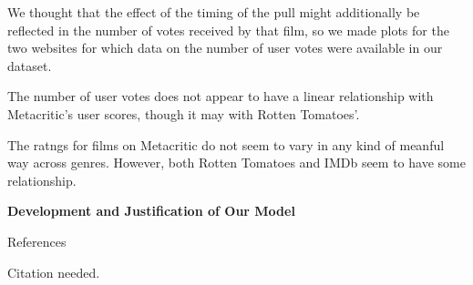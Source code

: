 \documentclass[a4paper,12pt]{report}
\begin{document}
	We thought that the effect of the timing of the pull might additionally be reflected in the number of votes received by that film, so we made plots for the two websites for which data on the number of user votes were available in our dataset.
	\begin{center}
	\end{center}
	The number of user votes does not appear to have a linear relationship with Metacritic's user scores, though it may with Rotten Tomatoes'.
	\begin{center}
	\end{center}
	The ratngs for films on Metacritic do not seem to vary in any kind of meanful way across genres. However, both Rotten Tomatoes and IMDb seem to have some relationship.
	\begin{center}
	\end{center}
	\begin{center}
		\textbf{Development and Justification of Our Model}
	\end{center}
	\justify
	\lipsum[14-17]
	
	\newpage
	
	\begin{center}
		References
	\end{center}
	\raggedright
	\begin{hangparas}{.5in}{1}
		Citation needed.
	\end{hangparas}
\end{document}
